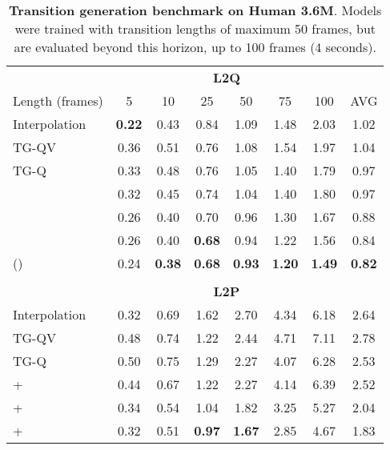 \documentclass[acmtog]{acmart}
\begin{document}
\begin{table}[h]
\caption{\textbf{Transition generation benchmark on Human 3.6M}. Models were trained with transition lengths of maximum 50 frames, but are evaluated beyond this horizon, up to 100 frames (4 seconds).}
    \begin{adjustbox}{width=\columnwidth,center}
    \centering
    \footnotesize
    \renewcommand{\arraystretch}{0.85}
    \begin{tabular}{lcccc|cc|c}
        &\multicolumn{6}{c}{\textbf{L2Q}}\\
        \cmidrule(r){2-8}
        Length (frames) &5&10&25&50&75&100&AVG \\
        \midrule 
        Interpolation                                   & \textbf{0.22} &0.43 &0.84 &1.09 &1.48 &2.03 &1.02\\
        TG-QV                                           & 0.36	&0.51 &0.76	&1.08 &1.54	&1.97 &1.04\\
        \cmidrule(lr){1-8}
        TG-Q                                            & 0.33	&0.48 &0.76	&1.05 &1.40	&1.79 &0.97\\
                                    & 0.32	&0.45 &0.74	&1.04 &1.40	&1.80 &0.97\\
                                  & 0.26	&0.40 &0.70	&0.96 &1.30 &1.67 &0.88\\                        & 0.26	&0.40 &\textbf{0.68} &0.94 &1.22 &1.56 &0.84\\
         ()                            & 0.24	&\textbf{0.38} &\textbf{0.68} &\textbf{0.93} &\textbf{1.20} &\textbf{1.49} &\textbf{0.82}\\
        \\
        &\multicolumn{6}{c}{\textbf{L2P}}\\
        \cmidrule(r){2-8}
        Interpolation                                   & 0.32  &0.69 &1.62 &2.70 &4.34  &6.18 &2.64\\
        TG-QV                                           & 0.48	&0.74 &1.22	&2.44 &4.71 &7.11 &2.78\\
        \cmidrule(lr){1-8}
        TG-Q                                            & 0.50	&0.75 &1.29	&2.27 &4.07	&6.28 &2.53\\
         +                            & 0.44	&0.67 &1.22	&2.27 &4.14	&6.39 &2.52\\
        +                           & 0.34	&0.54 &1.04	&1.82 &3.25	&5.27 &2.04\\ +                        & 0.32	&0.51 &\textbf{0.97}	&\textbf{1.67} &2.85	&4.67 &1.83\\ 

\end{tabular}
\end{adjustbox}
\end{table}
\end{document}
